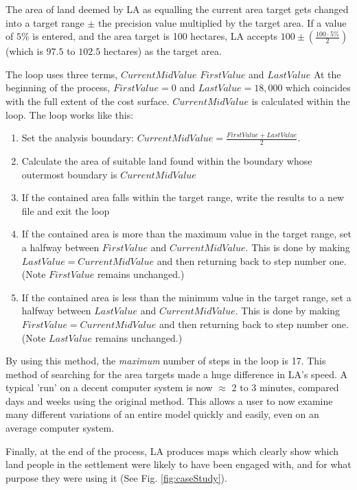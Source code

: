   The area of land deemed by LA as equalling the current area target gets changed into
  a target range $\pm$ the precision value multiplied by the target area. 
  If a value of $5\%$ is entered, and the area target is 100 hectares, LA 
  accepts $100 \pm(\frac{100 \cdot 5\%}{2})$ (which is $97.5$ to $102.5$ hectares)
  as the target area.  
  
  The loop uses three terms, $CurrentMidValue$ $FirstValue$ and $LastValue$ At the
  beginning of the process, $FirstValue=0$ and $LastValue=18,000$ which coincides
  with the full extent of the cost surface.  $CurrentMidValue$ is calculated
  within the loop.  The loop works like this:

  \begin{enumerate} 
    \item Set the analysis boundary: $CurrentMidValue=\frac{FirstValue +
      LastValue}{2}$.  
    \item Calculate the area of suitable land found within the boundary whose
      outermost boundary is $CurrentMidValue$ 
    \item If the contained area falls within the target range, write the results
      to a new file and exit the loop 
    \item If the contained area is more than the maximum value in the target
      range, set a halfway between $FirstValue$ and $CurrentMidValue$. This is done
      by making $LastValue=CurrentMidValue$ and then returning back to step number
      one.  (Note $FirstValue$ remains unchanged.) 
    \item If the contained area is less than the minimum value in the target
      range, set a halfway between $LastValue$ and $CurrentMidValue$. This is done
      by making $FirstValue=CurrentMidValue$ and then returning back to step number
      one.  (Note $LastValue$ remains unchanged.) 
  \end{enumerate}

  By using this method, the \textit{maximum} number of steps in the loop is 17.
  This method of searching for the area targets made a huge difference in LA's
  speed.  A typical 'run' on a decent computer system is now $\approx$ 2 to 3
  minutes, compared days and weeks using the original method.  This allows a
  user to now examine many different variations of an entire model quickly and
  easily, even on an average computer system.
  
  Finally, at the end of the process, LA produces maps which clearly show
  which land people in the settlement were likely to have been engaged with, and for
  what purpose they were using it (See Fig. \ref{fig:caseStudy}).
 

